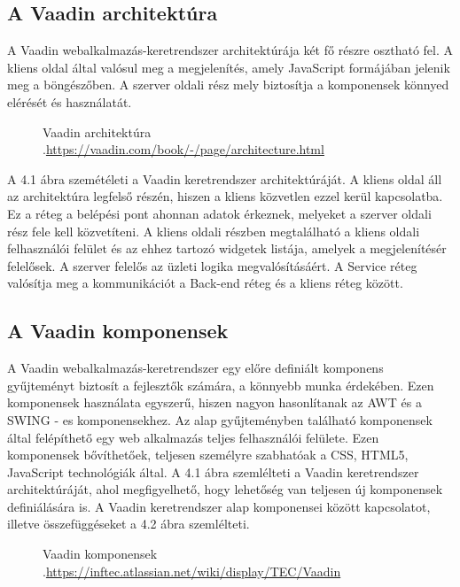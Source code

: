 \subsection{A Vaadin architektúra}\label{sec:Vaadin architektura}

A Vaadin webalkalmazás-keretrendszer architektúrája két fő részre osztható fel. A kliens oldal által valósul meg a megjelenítés, amely JavaScript formájában jelenik meg a böngészőben. A szerver oldali rész  mely biztosítja a komponensek könnyed elérését és használatát.
\begin{figure}[h]
  \centering
  \caption[Vaadin keretrendszer architektúrája]%
  {Vaadin architektúra\\
  {\white .}\hfill\url{https://vaadin.com/book/-/page/architecture.html}}
  \label{fig:vaadinArchitektura}
\end{figure} 

A 4.1 ábra szemétéleti a Vaadin keretrendszer architektúráját.
A kliens oldal áll az architektúra legfelső részén, hiszen a kliens közvetlen ezzel kerül kapcsolatba. Ez a réteg a belépési pont ahonnan adatok érkeznek, melyeket a szerver oldali rész fele kell közvetíteni. A kliens oldali részben megtalálható a kliens oldali felhasználói felület és az ehhez tartozó widgetek listája, amelyek a megjelenítésér felelősek. 
A szerver felelős az üzleti logika megvalósításáért. A Service réteg valósítja meg a kommunikációt a Back-end réteg és a kliens réteg között. 


\subsection{A Vaadin komponensek}\label{sec:Vaadin komponensek}

A Vaadin webalkalmazás-keretrendszer egy előre definiált komponens gyűjteményt biztosít a fejlesztők számára, a könnyebb munka érdekében. Ezen komponensek használata egyszerű, hiszen nagyon hasonlítanak az AWT és a SWING  - es komponensekhez. Az alap gyűjteményben található komponensek által felépíthető egy web alkalmazás teljes felhasználói felülete. Ezen komponensek bővíthetőek, teljesen személyre szabhatóak a CSS, HTML5, JavaScript technológiák által. A 4.1 ábra szemlélteti a Vaadin keretrendszer architektúráját, ahol megfigyelhető, hogy lehetőség van teljesen új komponensek definiálására is.
A Vaadin keretrendszer alap komponensei között kapcsolatot, illetve összefüggéseket a 4.2 ábra szemlélteti. 
\begin{figure}[h]
  \centering
  \caption[Vaadin keretrendszer komponensei]%
  {Vaadin komponensek\\
  {\white .}\hfill\url{https://inftec.atlassian.net/wiki/display/TEC/Vaadin}}
  \label{fig:vaadinComponents}
\end{figure} 

